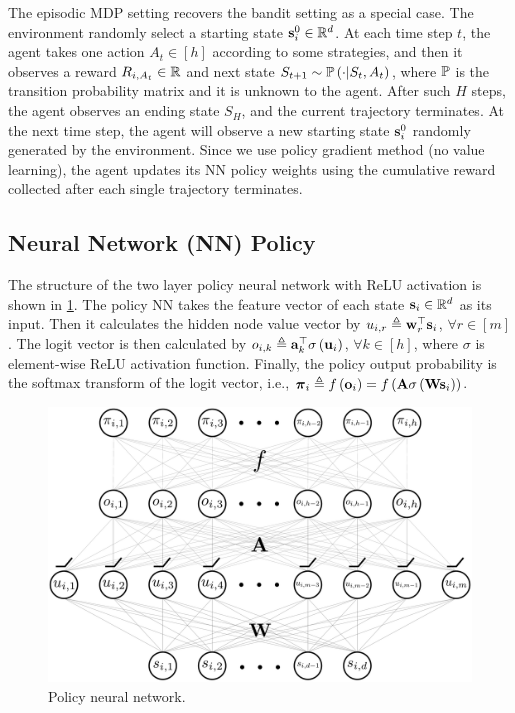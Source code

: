 The episodic MDP setting recovers the bandit setting as a special case. The environment randomly select a starting state ${\mathbf{s}}_i^0 \in {\mathbb{R}}^d$. At each time step $t$, the agent takes one action $A_t \in [h]$ according to some strategies, and then it observes a reward $R_{i, A_t} \in {\mathbb{R}}$ and next state $S_{t+1} \sim {\mathbb{P}}\left( \cdot \middle| S_t, A_t \right)$, where ${\mathbb{P}}$ is the transition probability matrix and it is unknown to the agent. After such $H$ steps, the agent observes an ending state $S_H$, and the current trajectory terminates. At the next time step, the agent will observe a new starting state ${\mathbf{s}}_i^0$ randomly generated by the environment. Since we use policy gradient method (no value learning), the agent updates its NN policy weights using the cumulative reward collected after each single trajectory terminates.

\subsection{Neural Network (NN) Policy}
\label{subsec:nn_policy}

The structure of the two layer policy neural network with ReLU activation is shown in \cref{fig:nn_policy}. The policy NN takes the feature vector of each state ${\mathbf{s}}_i \in {\mathbb{R}}^d$ as its input. Then it calculates the hidden node value vector by $u_{i,r} \triangleq {\mathbf{w}}_r^\top {\mathbf{s}}_i$, $\forall r \in [m]$. The logit vector is then calculated by $o_{i,k} \triangleq {\mathbf{a}}_k^\top \sigma\left( {\mathbf{u}}_i \right)$, $\forall k \in [h]$, where $\sigma$ is element-wise ReLU activation function. Finally, the policy output probability is the softmax transform of the logit vector, i.e., ${\boldsymbol{\pi}}_i \triangleq f\left( {\mathbf{o}}_i \right) = f\left( {\mathbf{A}} \sigma\left( {\mathbf{W}} {\mathbf{s}}_i \right) \right)$. 
\begin{figure}[t]
\vskip 0.2in
\begin{center}
\centerline{\includegraphics[width=\columnwidth]{nn_policy.pdf}}
\caption{Policy neural network.}
\label{fig:nn_policy}
\end{center}
\vskip -0.2in
\end{figure}

